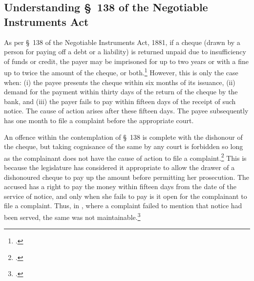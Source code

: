 \documentclass[12pt,a4paper]{article}
\begin{document}
\newpage
\begin{appendices}

\section{Understanding \S~138 of the Negotiable Instruments Act} \label{app:understanding}

As per \S~138 of the Negotiable Instruments Act, 1881, if a cheque (drawn by a person for paying off a debt or a liability) is returned unpaid due to insufficiency of funds or credit, the payer may be imprisoned for up to two years or with a fine up to twice the amount of the cheque, or both.\footcite[A \textit{cheque} is defined as per \S~6 of the NI Act. It is a bill of exchange drawn on a specified banker and not expressed to be payable otherwise than on-demand. It includes the electronic image of a truncated cheque and a cheque in electronic form. Once a cheque has been signed and issued in favour of the cheque holder, there is a statutory presumption \S~139 of the NI Act that the cheque is issued in discharge of a legally enforceable debt or liability. However, said presumption is a rebuttable one. The issuer of the cheque can rebut that presumption by adducing credible evidence that the cheque was issued for some other purpose like security for a loan.][]{sc2018_murugun} However, this is only the case when: (i) the payee presents the cheque within six months of its issuance, (ii) demand for the payment within thirty days of the return of the cheque by the bank, and (iii) the payer fails to pay within fifteen days of the receipt of such notice. The cause of action arises after these fifteen days. The payee subsequently has one month to file a complaint before the appropriate court.

An offence within the contemplation of \S~138 is complete with the dishonour of the cheque, but taking cognisance of the same by any court is forbidden so long as the complainant does not have the cause of action to file a complaint.\footcite{sc2014_dashrath} This is because the legislature has considered it appropriate to allow the drawer of a dishonoured cheque to pay up the amount before permitting her prosecution. The accused has a right to pay the money within fifteen days from the date of the service of notice, and only when she fails to pay is it open for the complainant to file a complaint. Thus, in , where a complaint failed to mention that notice had been served, the same was not maintainable.\footcite{sc2002_shakti}


\end{appendices}
\end{document}
